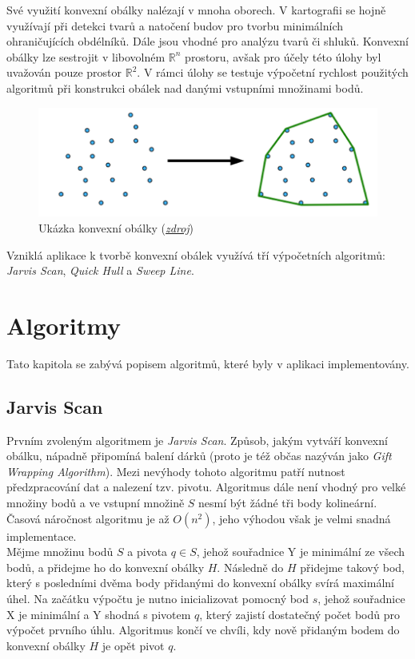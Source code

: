 \documentclass[a4paper, 12pt]{article}
\begin{document}
Své využití konvexní obálky nalézají v mnoha oborech. V kartografii se hojně využívají při detekci tvarů a natočení budov pro tvorbu minimálních ohraničujících obdélníků. Dále jsou vhodné pro analýzu tvarů či shluků. Konvexní obálky lze sestrojit v libovolném $\mathbb{R}^n$ prostoru, avšak pro účely této úlohy byl uvažován pouze prostor $\mathbb{R}^2$. V rámci úlohy se testuje výpočetní rychlost použitých algoritmů při konstrukci obálek nad danými vstupními množinami bodů.

\begin{figure}[h!]
	\centering
	\includegraphics[width=13cm]{./pictures/ch.png}
	\caption{Ukázka konvexní obálky (\href{http://mind.cs.byu.edu/courses/312/projects/project2_files/ConvexHull_python.php}{\textsl{zdroj}})}
\end{figure}

Vzniklá aplikace k tvorbě konvexní obálek využívá tří výpočetních algoritmů: \textit{Jarvis Scan}, \textit{Quick Hull} a \textit{Sweep Line}.

\section{Algoritmy}
Tato kapitola se zabývá popisem algoritmů, které byly v aplikaci implementovány. 

\subsection{Jarvis Scan}
Prvním zvoleným algoritmem je \textit{Jarvis Scan}. Způsob, jakým vytváří konvexní obálku, nápadně připomíná balení dárků (proto je též občas nazýván jako \textit{Gift Wrapping Algorithm}). Mezi nevýhody tohoto algoritmu patří nutnost předzpracování dat a nalezení tzv. pivotu. Algoritmus dále není vhodný pro velké množiny bodů a ve vstupní množině $S$ nesmí být žádné tři body kolineární. Časová náročnost algoritmu je až $O(n^2)$, jeho výhodou však je velmi snadná implementace.\\

Mějme množinu bodů $S$ a pivota $q \in S$, jehož souřadnice Y je minimální ze všech bodů, a přidejme ho do konvexní obálky $H$. Následně do $H$ přidejme takový bod, který s posledními dvěma body přidanými do konvexní obálky svírá maximální úhel. Na začátku výpočtu je nutno inicializovat pomocný bod $s$, jehož souřadnice X je minimální a Y shodná s pivotem $q$, který zajistí dostatečný počet bodů pro výpočet prvního úhlu. Algoritmus končí ve chvíli, kdy nově přidaným bodem do konvexní obálky $H$ je opět pivot $q$. \\
\end{document}
